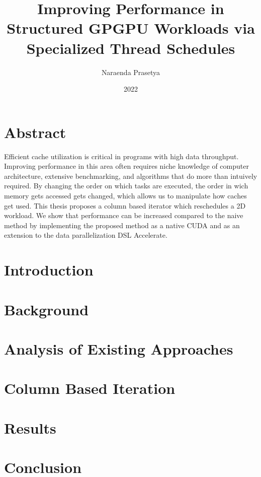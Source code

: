 \documentclass{report}
\title{Improving Performance in Structured GPGPU Workloads via Specialized Thread Schedules}
\author{Naraenda Prasetya}
\date{2022}
\begin{document}
\maketitle

\chapter*{Abstract}
Efficient cache utilization is critical in programs with high data throughput.
Improving performance in this area often requires niche knowledge of computer architecture, extensive benchmarking, and algorithms that do more than intuively required.
By changing the order on which tasks are executed, the order in wich memory gets accessed gets changed, which allows us to manipulate how caches get used.
This thesis proposes a column based iterator which reschedules a 2D workload.
We show that performance can be increased compared to the naive method by implementing the proposed method as a native CUDA and as an extension to the data parallelization DSL Accelerate.

\tableofcontents

\chapter{Introduction}
\label{chap:introduction}


\chapter{Background}
\label{chap:background}


\chapter{Analysis of Existing Approaches}
\label{chap:analysis}


\chapter{Column Based Iteration}
\label{chap:cbi}


\chapter{Results}
\label{chap:results}


\chapter{Conclusion}
\label{chap:conclusion}




\end{document}
